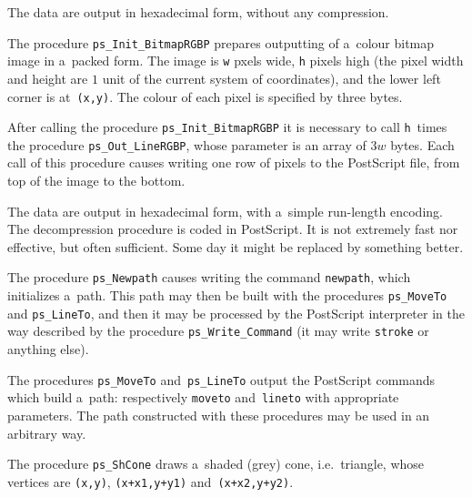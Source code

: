 The data are output in hexadecimal form, without any compression.

\vspace{\bigskipamount}
The procedure \texttt{ps\_Init\_BitmapRGBP} prepares outputting of a~colour
bitmap image in a~packed form. The image is \texttt{w} pxels wide,
\texttt{h} pixels high (the pixel width and height are $1$ unit
of the current system of coordinates), and the lower left corner
is at~\texttt{(x,y)}. The colour of each pixel is specified by three bytes.

After calling the procedure \texttt{ps\_Init\_BitmapRGBP} it is necessary to call
\texttt{h}~times the procedure \texttt{ps\_Out\_LineRGBP}, whose parameter is
an array of $3w$ bytes.
Each call of this procedure causes writing one row of pixels to the
PostScript file, from top of the image to the bottom.

The data are output in hexadecimal form, with a~simple run-length encoding.
The decompression procedure is coded in PostScript. It is not extremely
fast nor effective, but often sufficient. Some day it might be
replaced by something better.

\vspace{\bigskipamount}
The procedure \texttt{ps\_Newpath} causes writing the command
\texttt{newpath}, which initializes a~path. This path may then be built
with the procedures \texttt{ps\_MoveTo} and \texttt{ps\_LineTo}, and then
it may be processed by the PostScript interpreter
in the way described by the procedure \texttt{ps\_Write\_Command}
(it may write \texttt{stroke} or anything else).

\vspace{\bigskipamount}
The procedures \texttt{ps\_MoveTo} and~\texttt{ps\_LineTo} output the PostScript
commands which build a~path: respectively \texttt{moveto} and~\texttt{lineto}
with appropriate parameters. The path constructed with these procedures may
be used in an arbitrary way.

\vspace{\bigskipamount}
The procedure \texttt{ps\_ShCone} draws a~shaded (grey) cone, i.e.\
triangle, whose vertices are \texttt{(x,y)}, \texttt{(x+x1,y+y1)}
and~\texttt{(x+x2,y+y2)}.

